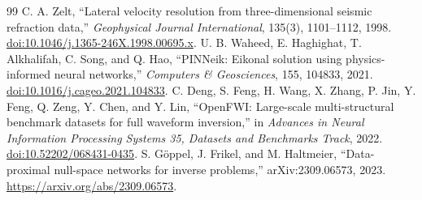 \documentclass[11pt]{article}
\begin{document}
{\begin{thebibliography}{99}
 C. A. Zelt, ``Lateral velocity resolution from three-dimensional seismic refraction data,'' \emph{Geophysical Journal International}, 135(3), 1101--1112, 1998. \href{https://doi.org/10.1046/j.1365-246X.1998.00695.x}{doi:10.1046/j.1365-246X.1998.00695.x}.
 U. B. Waheed, E. Haghighat, T. Alkhalifah, C. Song, and Q. Hao, ``PINNeik: Eikonal solution using physics-informed neural networks,'' \emph{Computers \& Geosciences}, 155, 104833, 2021. \href{https://doi.org/10.1016/j.cageo.2021.104833}{doi:10.1016/j.cageo.2021.104833}.
 C. Deng, S. Feng, H. Wang, X. Zhang, P. Jin, Y. Feng, Q. Zeng, Y. Chen, and Y. Lin, ``OpenFWI: Large-scale multi-structural benchmark datasets for full waveform inversion,'' in \emph{Advances in Neural Information Processing Systems 35, Datasets and Benchmarks Track}, 2022. \href{https://doi.org/10.52202/068431-0435}{doi:10.52202/068431-0435}.
 S. G\"oppel, J. Frikel, and M. Haltmeier, ``Data-proximal null-space networks for inverse problems,'' arXiv:2309.06573, 2023. \url{https://arxiv.org/abs/2309.06573}.
\end{thebibliography}
}
\end{document}
